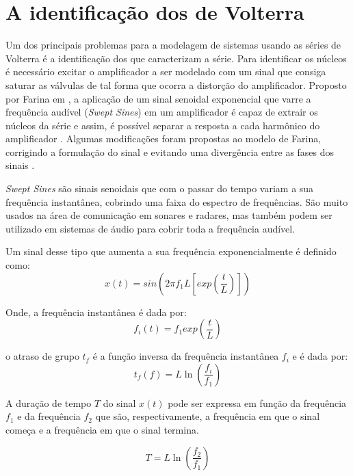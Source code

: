 \section*{A identificação dos  de Volterra} \label{ident}
Um dos principais problemas para a modelagem de sistemas usando as séries de Volterra é a identificação dos  que caracterizam a série. Para identificar os núcleos é necessário excitar o amplificador a ser modelado com um sinal que consiga saturar as válvulas de tal forma que ocorra a distorção do amplificador. Proposto por Farina em \cite{farina2001non}, a aplicação de um sinal senoidal exponencial que varre a frequência audível (\textit{Swept Sines}) em um amplificador é capaz de extrair os núcleos da série e assim, é possível separar a resposta a cada harmônico do amplificador \cite{schmitz2017hammerstein}. Algumas modificações foram propostas ao modelo de Farina, corrigindo a formulação do sinal e evitando uma divergência entre as fases dos sinais \cite{novakdissertation}.

\textit{Swept Sines} são sinais senoidais que com o passar do tempo variam a sua frequência instantânea, cobrindo uma faixa do espectro de frequências.
São muito usados na área de comunicação em sonares e radares, mas também podem ser utilizado em sistemas de áudio para cobrir toda a frequência audível.

Um sinal desse tipo que aumenta a sua frequência exponencialmente é definido como:
\begin{equation}
x(t) = sin (2\pi f_{1}L [exp(\dfrac{t}{L})])
\label{sinal exponencial}
\end{equation}

Onde, a frequência instantânea é dada por:
\begin{equation}
f_{i}(t) = f_{1} exp(\dfrac{t}{L})
\end{equation}

o atraso de grupo $t_{f}$ é a função inversa da frequência instantânea $f_{i}$ e é dada por:
\begin{equation}
t_{f}(f) = L \ln(\dfrac{f_{i}}{f_{1}})
\end{equation}

A duração de tempo $T$ do sinal $x(t)$ pode ser expressa em função da frequência $f_{1}$ e da frequência $f_{2}$ que são, respectivamente, a frequência em que o sinal começa e a frequência em que o sinal termina\cite{novak2010nonlinear}.

\begin{equation}
T = L \ln(\dfrac{f_{2}}{f_{1}})
\label{Equação 5.10}
\end{equation}


